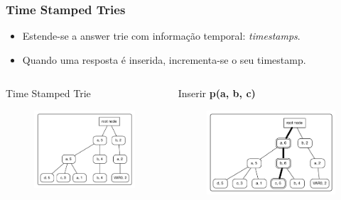 \documentclass{beamer}
\begin{document}
\begin{frame}
  \frametitle{Time Stamped Tries}
  \begin{itemize}
     \item Estende-se a answer trie com informação temporal: \emph{timestamps}.
     \item<2-> Quando uma resposta é inserida, incrementa-se o seu timestamp.
  \end{itemize}
  \begin{columns}[t]
        \begin{block}{Time Stamped Trie}
          \begin{figure}[ht]
            \centering
              \includegraphics[scale=0.4]{tst_1.pdf}
          \end{figure}
        \end{block}
        \pause
        \begin{block}{Inserir \textbf{p(a, b, c)}}
          \begin{figure}[ht]
            \centering
              \includegraphics[scale=0.4]{tst_2.pdf}
          \end{figure}
        \end{block}
    \end{columns}
\end{frame}
\end{document}
